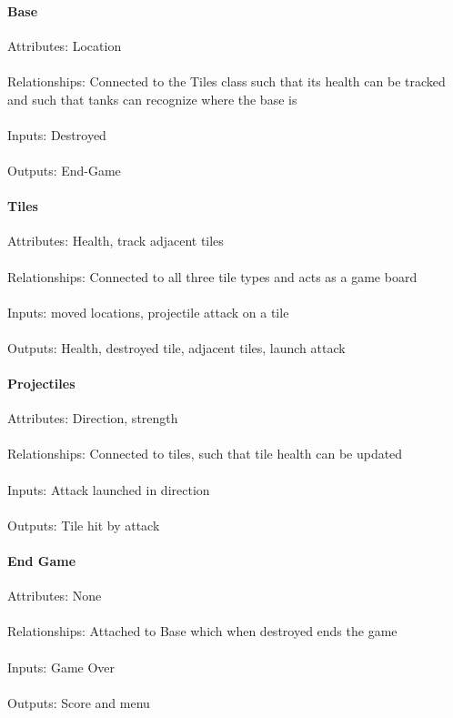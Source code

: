 \documentclass[12pt, titlepage]{article}
\begin{document}
\paragraph{Base}
Attributes: Location
\\\\Relationships: Connected to the Tiles class such that its health can be 
tracked and such that tanks can recognize where the base is
\\\\Inputs: Destroyed
\\\\Outputs: End-Game
\paragraph{Tiles}
Attributes: Health, track adjacent tiles
\\\\Relationships: Connected to all three tile types and acts as a game board
\\\\Inputs: moved locations, projectile attack on a tile
\\\\Outputs: Health, destroyed tile, adjacent tiles, launch attack
\paragraph{Projectiles}
Attributes: Direction, strength
\\\\Relationships: Connected to tiles, such that tile health can be updated
\\\\Inputs: Attack launched in direction
\\\\Outputs: Tile hit by attack
\paragraph{End Game}
Attributes: None
\\\\Relationships: Attached to Base which when destroyed ends the game
\\\\Inputs: Game Over
\\\\Outputs: Score and menu
\end{document}
